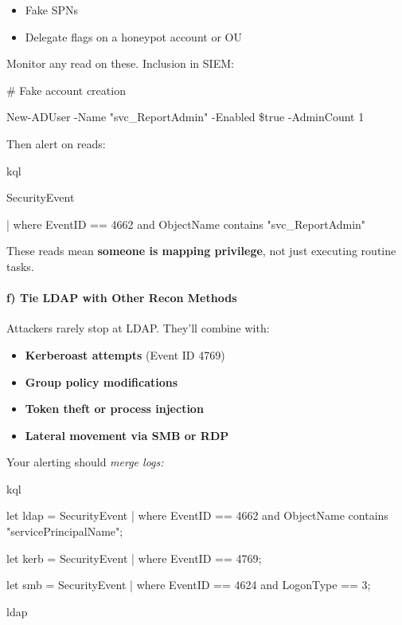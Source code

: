 {{\begin{itemize}
    \item Fake SPNs

    \item Delegate flags on a honeypot account or OU

\end{itemize}
Monitor any read on these. Inclusion in SIEM:

 

 

\# Fake account creation

New-ADUser -Name "svc\_ReportAdmin" -Enabled \$true -AdminCount 1

Then alert on reads:

kql

 

SecurityEvent 

| where EventID == 4662 and ObjectName contains "svc\_ReportAdmin"

These reads mean \textbf{someone is mapping privilege}, not just executing routine tasks.

\paragraph{\textbf{   f) Tie LDAP with Other Recon Methods}}

Attackers rarely stop at LDAP. They’ll combine with:

\begin{itemize}
    \item \textbf{Kerberoast attempts} (Event ID 4769)

    \item \textbf{Group policy modifications}

    \item \textbf{Token theft or process injection}

    \item \textbf{Lateral movement via SMB or RDP}

\end{itemize}
Your alerting should \textit{merge logs:}

kql

 

let ldap = SecurityEvent | where EventID == 4662 and ObjectName contains "servicePrincipalName";

let kerb = SecurityEvent | where EventID == 4769;

let smb = SecurityEvent | where EventID == 4624 and LogonType == 3;

ldap

}}
